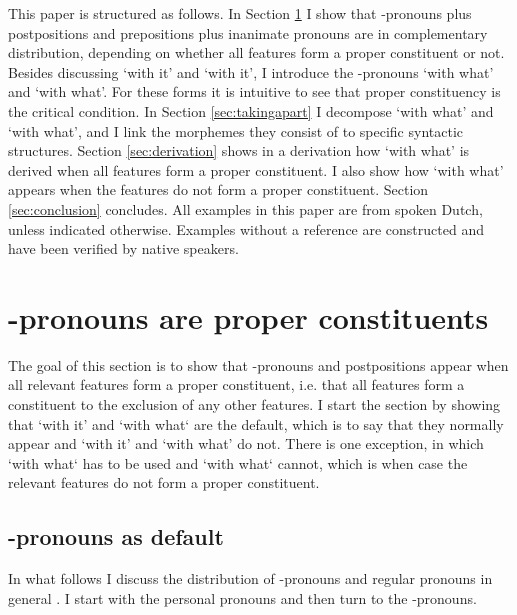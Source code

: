 \documentclass[11pt,a4paper]{article}
\begin{document}
This paper is structured as follows. In Section \ref{sec:distribution} I show that -pronouns plus postpositions and prepositions plus inanimate pronouns are in complementary distribution, depending on whether all features form a proper constituent or not. Besides discussing  `with it' and  `with it', I introduce the -pronouns  `with what' and  `with what'. For these forms it is intuitive to see that proper constituency is the critical condition.
In Section \ref{sec:takingapart} I decompose  `with what' and  `with what', and I link the morphemes they consist of to specific syntactic structures. Section \ref{sec:derivation} shows in a derivation how  `with what' is derived when all features form a proper constituent. I also show how  `with what' appears when the features do not form a proper constituent. Section \ref{sec:conclusion} concludes. All examples in this paper are from spoken Dutch, unless indicated otherwise. Examples without a reference are constructed and have been verified by native speakers.


\section{-pronouns are proper constituents}\label{sec:distribution}

The goal of this section is to show that -pronouns and postpositions appear when all relevant features form a proper constituent, i.e. that all features form a constituent to the exclusion of any other features. I start the section by showing that  `with it' and  `with what` are the default, which is to say that they normally appear and  `with it' and  `with what' do not. There is one exception, in which  `with what` has to be used and  `with what` cannot, which is when case the relevant features do not form a proper constituent.


\subsection{-pronouns as default}\label{sec:rdefault}

In what follows I discuss the distribution of -pronouns and regular pronouns in general \citep{riemsdijk1978,koopman1994}. I start with the personal pronouns and then turn to the -pronouns.
\end{document}
